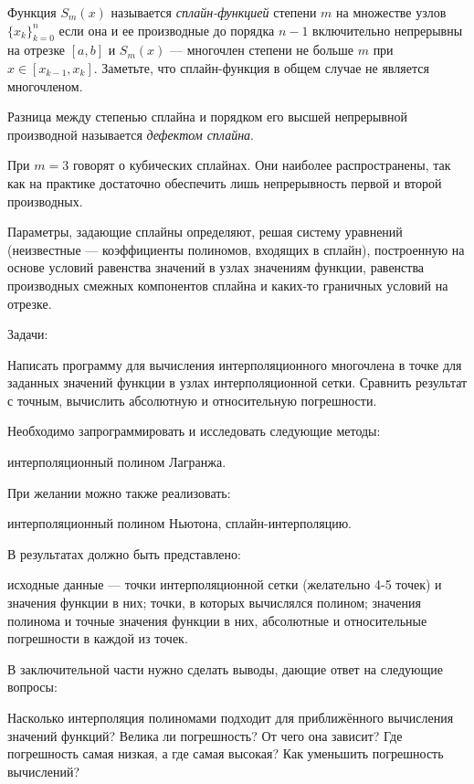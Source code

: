 Функция $S_{m}(x)$ называется \emph{сплайн-функцией}
степени $m$ на множестве узлов $\{x_{k}\}_{k=0}^{n}$ если она и
ее производные до порядка $n-1$ включительно непрерывны на отрезке
$[a,b]$ и $S_{m}(x)$ --- многочлен степени не больше $m$ при $x\in[x_{k-1},x_{k}]$.
Заметьте, что сплайн-функция в общем случае не является многочленом.

Разница между степенью сплайна и порядком его высшей непрерывной производной
называется \emph{дефектом сплайна}.

При $m=3$ говорят о кубических сплайнах. Они наиболее распространены,
так как на практике достаточно обеспечить лишь непрерывность первой
и второй производных.

Параметры, задающие сплайны определяют, решая систему уравнений (неизвестные
--- коэффициенты полиномов, входящих в сплайн), построенную на основе
условий равенства значений в узлах значениям функции, равенства производных
смежных компонентов сплайна и каких-то граничных условий на отрезке.

Задачи:

Написать программу для вычисления интерполяционного многочлена в точке
для заданных значений функции в узлах интерполяционной сетки. Сравнить
результат с точным, вычислить абсолютную и относительную погрешности.

Необходимо запрограммировать и исследовать следующие методы:

интерполяционный полином Лагранжа.

При желании можно также реализовать:

интерполяционный полином Ньютона, сплайн-интерполяцию.

В результатах должно быть представлено:

исходные данные — точки интерполяционной сетки (желательно 4-5 точек)
и значения функции в них; точки, в которых вычислялся полином; значения
полинома и точные значения функции в них, абсолютные и относительные
погрешности в каждой из точек.

В заключительной части нужно сделать выводы, дающие ответ на следующие
вопросы:

Насколько интерполяция полиномами подходит для приближённого вычисления
значений функций? Велика ли погрешность? От чего она зависит? Где
погрешность самая низкая, а где самая высокая? Как уменьшить погрешность
вычислений?

